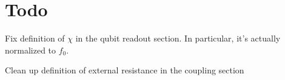 \section{Todo}
Fix definition of $\chi$ in the qubit readout section. In particular, it's actually normalized to $f_0$.

Clean up definition of external resistance in the coupling section
